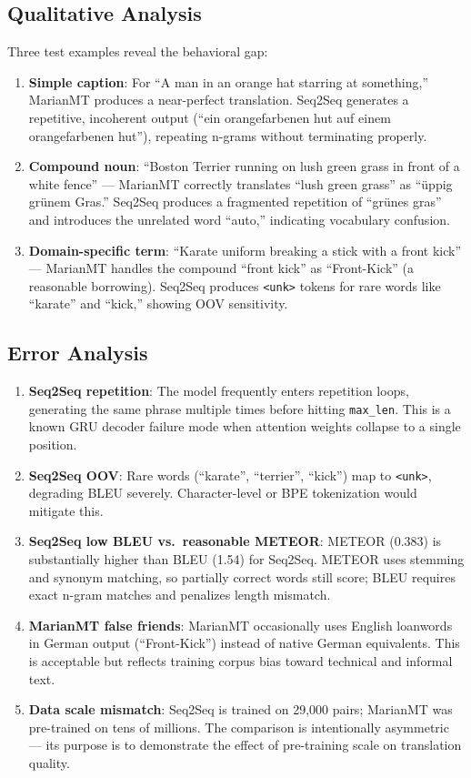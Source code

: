 \documentclass[12pt,a4paper]{article}
\begin{document}
\subsection{Qualitative Analysis}

Three test examples reveal the behavioral gap:

\begin{enumerate}
    \item \textbf{Simple caption}: For ``A man in an orange hat starring at something,'' MarianMT produces a near-perfect translation. Seq2Seq generates a repetitive, incoherent output (``ein orangefarbenen hut auf einem orangefarbenen hut''), repeating n-grams without terminating properly.

    \item \textbf{Compound noun}: ``Boston Terrier running on lush green grass in front of a white fence'' — MarianMT correctly translates ``lush green grass'' as ``üppig grünem Gras.'' Seq2Seq produces a fragmented repetition of ``grünes gras'' and introduces the unrelated word ``auto,'' indicating vocabulary confusion.

    \item \textbf{Domain-specific term}: ``Karate uniform breaking a stick with a front kick'' — MarianMT handles the compound ``front kick'' as ``Front-Kick'' (a reasonable borrowing). Seq2Seq produces \texttt{<unk>} tokens for rare words like ``karate'' and ``kick,'' showing OOV sensitivity.
\end{enumerate}

\subsection{Error Analysis}

\begin{enumerate}
    \item \textbf{Seq2Seq repetition}: The model frequently enters repetition loops, generating the same phrase multiple times before hitting \texttt{max\_len}. This is a known GRU decoder failure mode when attention weights collapse to a single position.
    \item \textbf{Seq2Seq OOV}: Rare words (``karate'', ``terrier'', ``kick'') map to \texttt{<unk>}, degrading BLEU severely. Character-level or BPE tokenization would mitigate this.
    \item \textbf{Seq2Seq low BLEU vs.\ reasonable METEOR}: METEOR (0.383) is substantially higher than BLEU (1.54) for Seq2Seq. METEOR uses stemming and synonym matching, so partially correct words still score; BLEU requires exact n-gram matches and penalizes length mismatch.
    \item \textbf{MarianMT false friends}: MarianMT occasionally uses English loanwords in German output (``Front-Kick'') instead of native German equivalents. This is acceptable but reflects training corpus bias toward technical and informal text.
    \item \textbf{Data scale mismatch}: Seq2Seq is trained on 29{,}000 pairs; MarianMT was pre-trained on tens of millions. The comparison is intentionally asymmetric — its purpose is to demonstrate the effect of pre-training scale on translation quality.
\end{enumerate}
\end{document}
